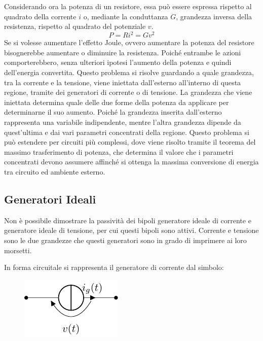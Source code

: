\documentclass{article}
\numberwithin{equation}{subsection}
\begin{document}
Considerando ora la potenza di un resistore, essa può essere espressa rispetto al quadrato della corrente $i$ o, mediante la conduttanza $G$, grandezza inversa della resistenza, 
rispetto al quadrato del potenziale $v$. 
\begin{equation*}
    P=Ri^2=Gv^2
\end{equation*}
Se si volesse aumentare l'effetto Joule, ovvero aumentare la potenza del resistore bisognerebbe aumentare o diminuire la resistenza. Poiché entrambe le azioni comporterebbero, 
senza ulteriori ipotesi l'aumento della potenza e quindi dell'energia convertita. Questo problema si risolve guardando a quale grandezza, tra la corrente e la tensione, 
viene iniettata dall'esterno all'interno di questa regione, tramite dei generatori di corrente o di tensione. La grandezza che viene iniettata determina quale delle due 
forme della potenza da applicare per determinarne il suo aumento. Poiché la grandezza inserita dall'esterno rappresenta una variabile indipendente, mentre l'altra 
grandezza dipende da quest'ultima e dai vari parametri concentrati della regione. Questo problema si può estendere per circuiti più complessi, dove viene risolto tramite 
il teorema del massimo trasferimento di potenza, che determina il valore che i parametri concentrati devono assumere affinché si ottenga la massima conversione di energia 
tra circuito ed ambiente esterno.  

\subsection{Generatori Ideali}

Non è possibile dimostrare la passività dei bipoli generatore ideale di corrente e generatore ideale di tensione, per cui questi bipoli sono attivi. Corrente e tensione sono 
le due grandezze che questi generatori sono in grado di imprimere ai loro morsetti. 

In forma circuitale si rappresenta il generatore di corrente dal simbolo:

\begin{figure}[H]%
    \centering
    \includegraphics{generatore-corrente.pdf}%
    \label{fig:generatore-corrente}
\end{figure}
\end{document}
